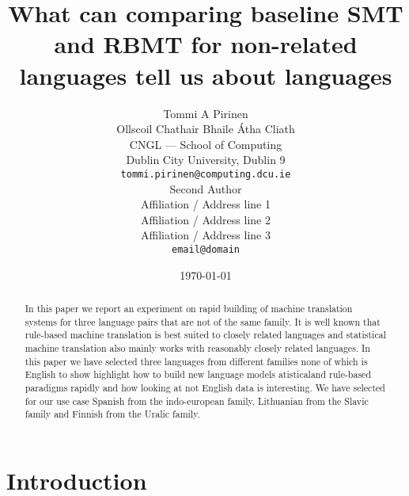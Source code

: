 \documentclass[11pt]{article}
\title{What can comparing baseline SMT and RBMT for non-related languages tell us about languages}
\author{Tommi A Pirinen \\
  Ollscoil Chathair Bhaile Átha Cliath \\
  CNGL --- School of Computing \\
  Dublin City University, Dublin 9 \\
  {\tt tommi.pirinen@computing.dcu.ie} \\\And
  Second Author \\
  Affiliation / Address line 1 \\
  Affiliation / Address line 2 \\
  Affiliation / Address line 3 \\
  {\tt email@domain} \\}
\date{\today}
\begin{document}
\maketitle
\begin{abstract}
  In this paper we report an experiment on rapid building of machine
  translation systems for three language pairs that are not of the same
  family. It is well known that rule-based machine translation is best
  suited to closely related languages and statistical machine translation
  also mainly works with reasonably closely related languages. In this
  paper we have selected three languages from different families none of
  which is English to show highlight how to build new language models atisticaland rule-based paradigms rapidly and how looking at not English data is
  interesting. We have selected for our use case Spanish from the
  indo-european family, Lithuanian from the Slavic family and Finnish from
  the Uralic family. 
\end{abstract}

\section{Introduction}





\end{document}
